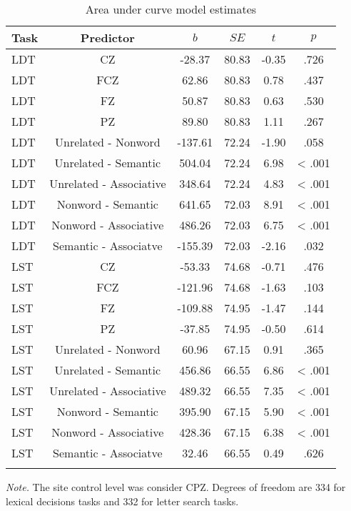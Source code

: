 \documentclass[english,man]{apa6}
\theoremstyle{definition}
\theoremstyle{definition}
\theoremstyle{definition}
\theoremstyle{remark}
\begin{document}
\begin{table}[tbp]
\begin{center}
\begin{threeparttable}
\caption{\label{tab:area-table-est}Area under curve model estimates}
\begin{tabular}{lccccc}
\toprule
Task & Predictor & $b$ & $SE$ & $t$ & $p$\\
\midrule
LDT & CZ & -28.37 & 80.83 & -0.35 & .726\\
LDT & FCZ & 62.86 & 80.83 & 0.78 & .437\\
LDT & FZ & 50.87 & 80.83 & 0.63 & .530\\
LDT & PZ & 89.80 & 80.83 & 1.11 & .267\\
LDT & Unrelated - Nonword & -137.61 & 72.24 & -1.90 & .058\\
LDT & Unrelated - Semantic & 504.04 & 72.24 & 6.98 & < .001\\
LDT & Unrelated - Associative & 348.64 & 72.24 & 4.83 & < .001\\
LDT & Nonword - Semantic & 641.65 & 72.03 & 8.91 & < .001\\
LDT & Nonword - Associative & 486.26 & 72.03 & 6.75 & < .001\\
LDT & Semantic - Associatve & -155.39 & 72.03 & -2.16 & .032\\
LST & CZ & -53.33 & 74.68 & -0.71 & .476\\
LST & FCZ & -121.96 & 74.68 & -1.63 & .103\\
LST & FZ & -109.88 & 74.95 & -1.47 & .144\\
LST & PZ & -37.85 & 74.95 & -0.50 & .614\\
LST & Unrelated - Nonword & 60.96 & 67.15 & 0.91 & .365\\
LST & Unrelated - Semantic & 456.86 & 66.55 & 6.86 & < .001\\
LST & Unrelated - Associative & 489.32 & 66.55 & 7.35 & < .001\\
LST & Nonword - Semantic & 395.90 & 67.15 & 5.90 & < .001\\
LST & Nonword - Associative & 428.36 & 67.15 & 6.38 & < .001\\
LST & Semantic - Associatve & 32.46 & 66.55 & 0.49 & .626\\
\bottomrule
\addlinespace
\end{tabular}
\begin{tablenotes}[para]
\textit{Note.} The site control level was consider CPZ. Degrees of freedom are 334 for lexical decisions tasks and 332 for letter search tasks.
\end{tablenotes}
\end{threeparttable}
\end{center}
\end{table}
\end{document}
